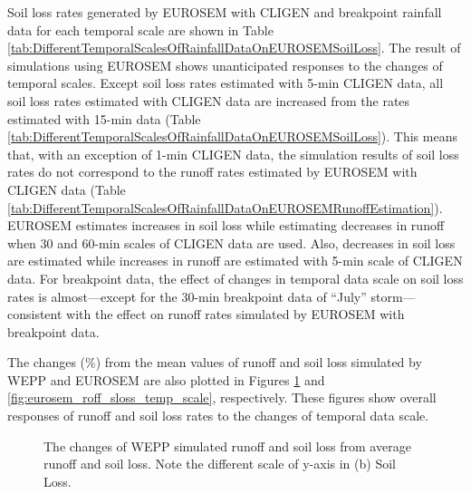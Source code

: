 Soil loss rates generated by EUROSEM with CLIGEN and breakpoint rainfall data
for each temporal scale are shown in Table
\ref{tab:DifferentTemporalScalesOfRainfallDataOnEUROSEMSoilLoss}. The result of
simulations using EUROSEM shows unanticipated responses to the changes of
temporal scales. Except soil loss rates estimated with 5-min CLIGEN data, all
soil loss rates estimated with CLIGEN data are increased from the rates
estimated with 15-min data
(Table \ref{tab:DifferentTemporalScalesOfRainfallDataOnEUROSEMSoilLoss}). This
means that, with an exception of 1-min CLIGEN data, the simulation results of
soil loss rates do not correspond to the runoff rates estimated by EUROSEM with
CLIGEN data (Table
\ref{tab:DifferentTemporalScalesOfRainfallDataOnEUROSEMRunoffEstimation}).
EUROSEM estimates increases in soil loss while estimating decreases in runoff
when 30 and 60-min scales of CLIGEN data are used. Also, decreases in soil loss
are estimated while increases in runoff are estimated with 5-min scale of CLIGEN
data. For breakpoint data, the effect of changes in temporal data scale on soil
loss rates is almost---except for the 30-min breakpoint data of ``July''
storm---consistent with the effect on runoff rates simulated by EUROSEM with
breakpoint data.

The changes (\%) from the mean values of runoff and soil loss simulated by WEPP
and EUROSEM are also plotted in Figures \ref{fig:wepp_roff_sloss_temp_scale} and
\ref{fig:eurosem_roff_sloss_temp_scale}, respectively. These figures show
overall responses of runoff and soil loss rates to the changes of temporal data
scale.

\begin{figure}[p]
  \centering
  \caption[WEPP runoff and soil loss changes]{The changes of WEPP simulated
runoff and soil loss from average runoff and soil loss. Note the different scale
of y-axis in (b) Soil Loss.}
  \label{fig:wepp_roff_sloss_temp_scale}
\end{figure}

